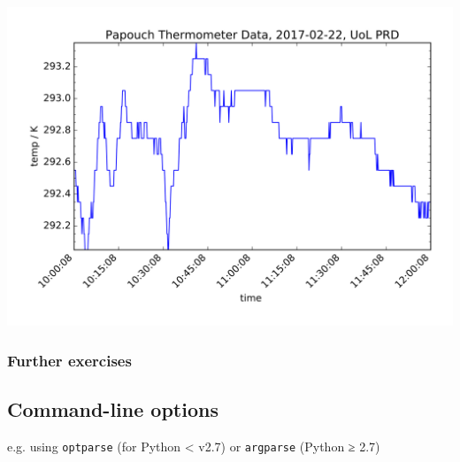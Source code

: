 \documentclass[aspectratio=1610,9pt]{beamer} %
\begin{document}
\begin{frame}

\includegraphics[width=\textwidth]{sensor_data_sample}

\end{frame}
\begin{frame}
\frametitle{Further exercises}

\subsection{Command-line options}

e.g. using \texttt{optparse} (for Python \textless{} v2.7) or
\texttt{argparse} (Python ≥ 2.7)
\end{frame}
\end{document}
